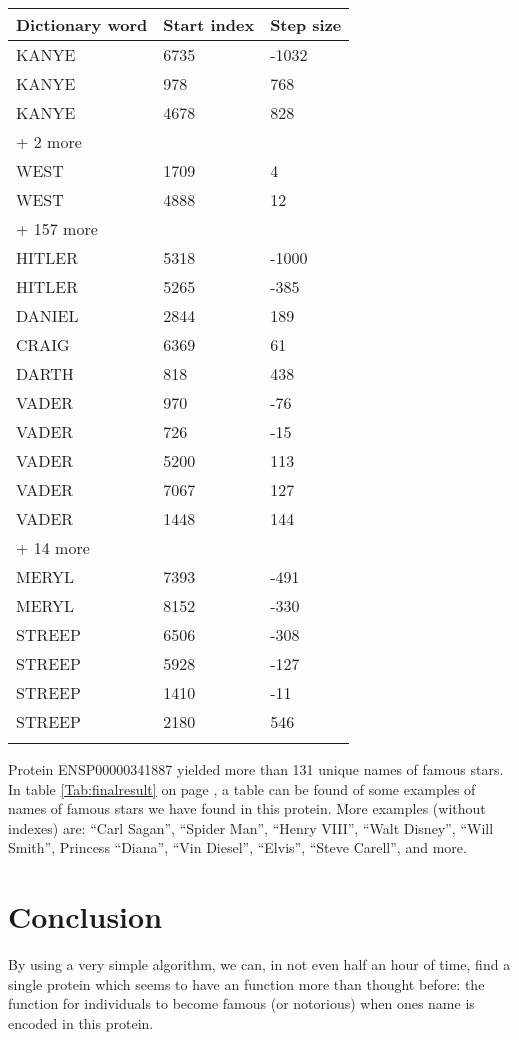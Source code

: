 \documentclass{bioinfo}
\begin{document}
\begin{table}[!t]
{\begin{tabular}{lll}\toprule
Dictionary word & Start index & Step size\\\midrule
KANYE & 6735 & -1032\\
KANYE & 978 & 768\\
KANYE & 4678 & 828\\
+ 2 more & & \\\botrule
WEST & 1709 & 4 \\
WEST & 4888 & 12 \\
+ 157 more & & \\\botrule
HITLER & 5318 & -1000\\
HITLER & 5265 & -385 \\\botrule
DANIEL & 2844 & 189\\
CRAIG & 6369 & 61 \\\botrule
DARTH & 818 & 438 \\
VADER & 970 & -76 \\ 
VADER & 726 & -15 \\ 
VADER & 5200 & 113 \\ 
VADER & 7067 & 127\\
VADER & 1448 & 144\\ 
+ 14 more & & \\ \botrule
MERYL & 7393 & -491 \\
MERYL & 8152 & -330 \\ 
STREEP & 6506 & -308 \\
STREEP & 5928 & -127 \\
STREEP & 1410 & -11 \\
STREEP & 2180 & 546 \\ \botrule
\end{tabular}}{}
\end{table}

Protein ENSP00000341887 yielded more than 131 unique names of famous stars. In table \ref{Tab:finalresult} on page \pageref{Tab:finalresult}, a table can be found of some examples of names of famous stars we have found in this protein. More examples (without indexes) are: ``Carl Sagan'', ``Spider Man'', ``Henry VIII'', ``Walt Disney'', ``Will Smith'', Princess ``Diana'', ``Vin Diesel'', ``Elvis'', ``Steve Carell'', and more.

\section{Conclusion}
By using a very simple algorithm, we can, in not even half an hour of time, find a single protein which seems to have an function more than thought before: the function for individuals to become famous (or notorious) when ones name is encoded in this protein.

\newpage




\end{document}
